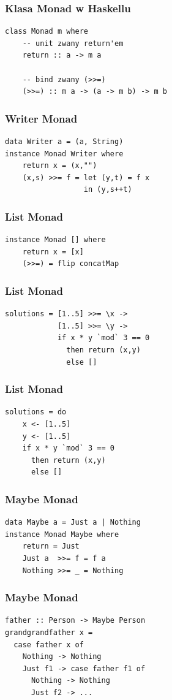 \documentclass[14pt]{beamer}
\begin{document}
\begin{frame}[fragile]
\frametitle{Klasa Monad w Haskellu}
\begin{verbatim}
class Monad m where
    -- unit zwany return'em
    return :: a -> m a

    -- bind zwany (>>=)
    (>>=) :: m a -> (a -> m b) -> m b
\end{verbatim}
\end{frame}

\begin{frame}[fragile]
\frametitle{Writer Monad}
\begin{verbatim}
data Writer a = (a, String)
instance Monad Writer where
    return x = (x,"")
    (x,s) >>= f = let (y,t) = f x
                  in (y,s++t)
\end{verbatim}
\end{frame}

\begin{frame}[fragile]
\frametitle{List Monad}
\begin{verbatim}
instance Monad [] where
    return x = [x]
    (>>=) = flip concatMap
\end{verbatim}
\end{frame}

\begin{frame}[fragile]
\frametitle{List Monad}
\begin{verbatim}
solutions = [1..5] >>= \x ->
            [1..5] >>= \y ->
            if x * y `mod` 3 == 0
              then return (x,y)
              else []
\end{verbatim}
\end{frame}

\begin{frame}[fragile]
\frametitle{List Monad}
\begin{verbatim}
solutions = do
    x <- [1..5]
    y <- [1..5]
    if x * y `mod` 3 == 0
      then return (x,y)
      else []
\end{verbatim}
\end{frame}

\begin{frame}[fragile]
\frametitle{Maybe Monad}
\begin{verbatim}
data Maybe a = Just a | Nothing
instance Monad Maybe where
    return = Just
    Just a  >>= f = f a
    Nothing >>= _ = Nothing
\end{verbatim}
\end{frame}

\begin{frame}[fragile]
\frametitle{Maybe Monad}
\begin{verbatim}
father :: Person -> Maybe Person
grandgrandfather x =
  case father x of
    Nothing -> Nothing
    Just f1 -> case father f1 of
      Nothing -> Nothing
      Just f2 -> ...
\end{verbatim}
\end{frame}
\end{document}
